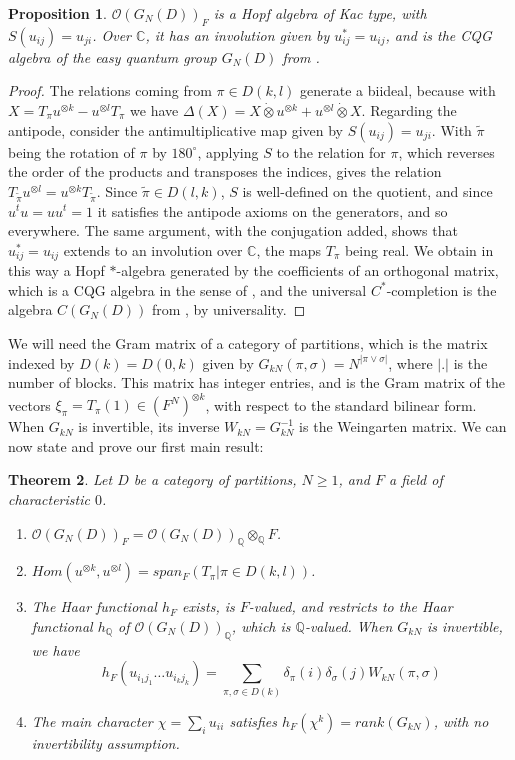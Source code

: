 \documentclass[11pt]{amsart}
\newtheorem{theorem}{Theorem}[section]
\newtheorem{proposition}[theorem]{Proposition}
\theoremstyle{definition}
\begin{document}
\begin{proposition}
\label{p22}
$\mathcal O(G_N(D))_F$ is a Hopf algebra of Kac type, with $S(u_{ij})=u_{ji}$. Over $\mathbb C$, it has an involution given by $u_{ij}^*=u_{ij}$, and is the CQG algebra of the easy quantum group $G_N(D)$ from \cite{bsp}.
\end{proposition}

\begin{proof}
The relations coming from $\pi\in D(k,l)$ generate a biideal, because with $X=T_\pi u^{\otimes k}-u^{\otimes l}T_\pi$ we have $\Delta(X)=X\dot\otimes u^{\otimes k}+u^{\otimes l}\dot\otimes X$. Regarding the antipode, consider the antimultiplicative map given by $S(u_{ij})=u_{ji}$. With $\tilde\pi$ being the rotation of $\pi$ by $180^\circ$, applying $S$ to the relation for $\pi$, which reverses the order of the products and transposes the indices, gives the relation $T_{\tilde\pi}u^{\otimes l}=u^{\otimes k}T_{\tilde\pi}$. Since $\tilde\pi\in D(l,k)$, $S$ is well-defined on the quotient, and since $u^tu=uu^t=1$ it satisfies the antipode axioms on the generators, and so everywhere. The same argument, with the conjugation added, shows that $u_{ij}^*=u_{ij}$ extends to an involution over $\mathbb C$, the maps $T_\pi$ being real. We obtain in this way a Hopf $*$-algebra generated by the coefficients of an orthogonal matrix, which is a CQG algebra in the sense of \cite{dko}, and the universal $C^*$-completion is the algebra $C(G_N(D))$ from \cite{bsp}, by universality.
\end{proof}

We will need the Gram matrix of a category of partitions, which is the matrix indexed by $D(k)=D(0,k)$ given by $G_{kN}(\pi,\sigma)=N^{|\pi\vee\sigma|}$, where $|.|$ is the number of blocks. This matrix has integer entries, and is the Gram matrix of the vectors $\xi_\pi=T_\pi(1)\in(F^N)^{\otimes k}$, with respect to the standard bilinear form. When $G_{kN}$ is invertible, its inverse $W_{kN}=G_{kN}^{-1}$ is the Weingarten matrix. We can now state and prove our first main result:

\begin{theorem}
\label{t23}
Let $D$ be a category of partitions, $N\geq1$, and $F$ a field of characteristic $0$.
\begin{enumerate}
\item $\mathcal O(G_N(D))_F=\mathcal O(G_N(D))_{\mathbb Q}\otimes_{\mathbb Q}F$.

\item $Hom(u^{\otimes k},u^{\otimes l})=span_F(T_\pi|\pi\in D(k,l))$.

\item The Haar functional $h_F$ exists, is $F$-valued, and restricts to the Haar functional $h_{\mathbb Q}$ of $\mathcal O(G_N(D))_{\mathbb Q}$, which is $\mathbb Q$-valued. When $G_{kN}$ is invertible, we have
$$h_F(u_{i_1j_1}\ldots u_{i_kj_k})=\sum_{\pi,\sigma\in D(k)}\delta_\pi(i)\delta_\sigma(j)W_{kN}(\pi,\sigma)$$

\item The main character $\chi=\sum_iu_{ii}$ satisfies $h_F(\chi^k)=rank(G_{kN})$, with no invertibility assumption.
\end{enumerate}
\end{theorem}
\end{document}
